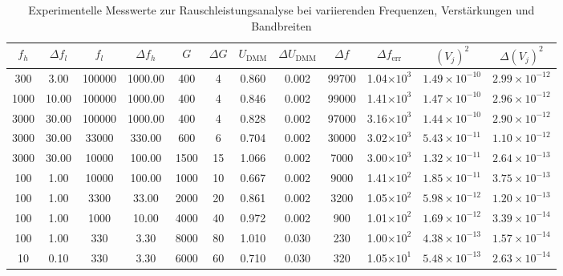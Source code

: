\begin{table}[h!]
\centering
\begin{tabular}{|c|c|c|c|c|c|c|c|c|c|c|c|}
\hline
$f_h$ & $\Delta f_l$ & $f_l$ & $\Delta f_h$ & $G$ & $\Delta G$ & $U_{\mathrm{DMM}}$ & $\Delta U_{\mathrm{DMM}}$ & $\Delta f$ & $\Delta f_{\text{err}}$ & $(V_j)^2$ & $\Delta (V_j)^2$ \\
\hline
300    & 3.00   & 100000  & 1000.00  & 400   & 4   & 0.860  & 0.002 & 99700  & 1.04$\times10^{3}$ & $1.49\times10^{-10}$ & $2.99\times10^{-12}$ \\
1000   & 10.00  & 100000  & 1000.00  & 400   & 4   & 0.846  & 0.002 & 99000  & 1.41$\times10^{3}$ & $1.47\times10^{-10}$ & $2.96\times10^{-12}$ \\
3000   & 30.00  & 100000  & 1000.00  & 400   & 4   & 0.828  & 0.002 & 97000  & 3.16$\times10^{3}$ & $1.44\times10^{-10}$ & $2.90\times10^{-12}$ \\
3000   & 30.00  & 33000   & 330.00   & 600   & 6   & 0.704  & 0.002 & 30000  & 3.02$\times10^{3}$ & $5.43\times10^{-11}$ & $1.10\times10^{-12}$ \\
3000   & 30.00  & 10000   & 100.00   & 1500  & 15  & 1.066  & 0.002 & 7000   & 3.00$\times10^{3}$ & $1.32\times10^{-11}$ & $2.64\times10^{-13}$ \\
100    & 1.00   & 10000   & 100.00   & 1000  & 10  & 0.667  & 0.002 & 9000   & 1.41$\times10^{2}$ & $1.85\times10^{-11}$ & $3.75\times10^{-13}$ \\
100    & 1.00   & 3300    & 33.00    & 2000  & 20  & 0.861  & 0.002 & 3200   & 1.05$\times10^{2}$ & $5.98\times10^{-12}$ & $1.20\times10^{-13}$ \\
100    & 1.00   & 1000    & 10.00    & 4000  & 40  & 0.972  & 0.002 & 900    & 1.01$\times10^{2}$ & $1.69\times10^{-12}$ & $3.39\times10^{-14}$ \\
100    & 1.00   & 330     & 3.30     & 8000  & 80  & 1.010  & 0.030 & 230    & 1.00$\times10^{2}$ & $4.38\times10^{-13}$ & $1.57\times10^{-14}$ \\
10     & 0.10   & 330     & 3.30     & 6000  & 60  & 0.710  & 0.030 & 320    & 1.05$\times10^{1}$ & $5.48\times10^{-13}$ & $2.63\times10^{-14}$ \\
\hline
\end{tabular}
\caption{Experimentelle Messwerte zur Rauschleistungsanalyse bei variierenden Frequenzen, Verstärkungen und Bandbreiten}
\label{tab:gerundet}
\end{table}

